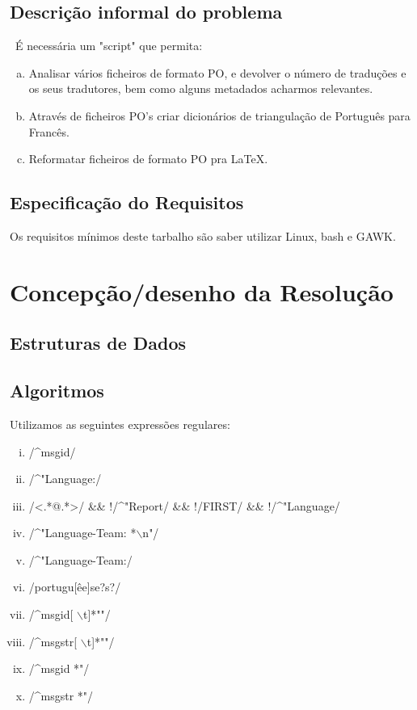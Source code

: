 \documentclass{report}
\begin{document}
\section{Descrição informal do problema}\
É necessária um "script" que permita:
\begin{enumerate}[a)]
\item Analisar vários ficheiros de formato PO, e devolver o número de traduções
e os seus tradutores, bem como alguns metadados acharmos relevantes.
\item Através de ficheiros PO's criar dicionários de triangulação de Português
para Francês.
\item Reformatar ficheiros de formato PO pra LaTeX.
\end{enumerate}

\section{Especificação do Requisitos}
Os requisitos mínimos deste tarbalho são saber utilizar Linux, bash e GAWK.

\chapter{Concepção/desenho da Resolução}
\section{Estruturas de Dados}
\section{Algoritmos}
Utilizamos as seguintes expressões regulares:

\begin{enumerate}[i)]
\item /\^{}msgid/
\item /\^{}"Language:/
\item /\textless.*@.*\textgreater/ \&\& !/\^{}"Report/ \&\& !/FIRST/ \&\& !/\^{}"Language/
\item /\^{}"Language-Team: *$\backslash$n"/
\item /\^{}"Language-Team:/
\item /portugu[êe]se?s?/
\item /\^{}msgid[ $\backslash$t]*""/
\item /\^{}msgstr[ $\backslash$t]*""/
\item /\^{}msgid *"/
\item /\^{}msgstr *"/
\end{enumerate}
\end{document}
